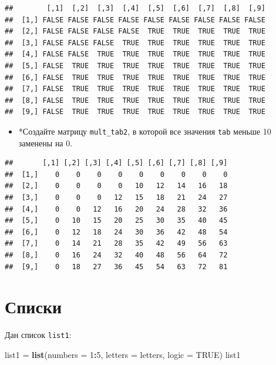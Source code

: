 \documentclass[]{book}
\newenvironment{Shaded}{\begin{snugshade}}{\end{snugshade}}
\newcommand{\KeywordTok}[1]{\textcolor[rgb]{0.13,0.29,0.53}{\textbf{#1}}}
\newcommand{\DataTypeTok}[1]{\textcolor[rgb]{0.13,0.29,0.53}{#1}}
\newcommand{\DecValTok}[1]{\textcolor[rgb]{0.00,0.00,0.81}{#1}}
\newcommand{\StringTok}[1]{\textcolor[rgb]{0.31,0.60,0.02}{#1}}
\newcommand{\OtherTok}[1]{\textcolor[rgb]{0.56,0.35,0.01}{#1}}
\newcommand{\OperatorTok}[1]{\textcolor[rgb]{0.81,0.36,0.00}{\textbf{#1}}}
\newcommand{\NormalTok}[1]{#1}
\providecommand{\tightlist}{%
  \setlength{\itemsep}{0pt}\setlength{\parskip}{0pt}}
\begin{document}
\begin{verbatim}
##        [,1]  [,2]  [,3]  [,4]  [,5]  [,6]  [,7]  [,8]  [,9]
##  [1,] FALSE FALSE FALSE FALSE FALSE FALSE FALSE FALSE FALSE
##  [2,] FALSE FALSE FALSE FALSE  TRUE  TRUE  TRUE  TRUE  TRUE
##  [3,] FALSE FALSE FALSE  TRUE  TRUE  TRUE  TRUE  TRUE  TRUE
##  [4,] FALSE FALSE  TRUE  TRUE  TRUE  TRUE  TRUE  TRUE  TRUE
##  [5,] FALSE  TRUE  TRUE  TRUE  TRUE  TRUE  TRUE  TRUE  TRUE
##  [6,] FALSE  TRUE  TRUE  TRUE  TRUE  TRUE  TRUE  TRUE  TRUE
##  [7,] FALSE  TRUE  TRUE  TRUE  TRUE  TRUE  TRUE  TRUE  TRUE
##  [8,] FALSE  TRUE  TRUE  TRUE  TRUE  TRUE  TRUE  TRUE  TRUE
##  [9,] FALSE  TRUE  TRUE  TRUE  TRUE  TRUE  TRUE  TRUE  TRUE
\end{verbatim}

\begin{itemize}
\tightlist
\item
  *Создайте матрицу \texttt{mult\_tab2}, в которой все значения
  \texttt{tab} меньше 10 заменены на 0.
\end{itemize}

\begin{verbatim}
##       [,1] [,2] [,3] [,4] [,5] [,6] [,7] [,8] [,9]
##  [1,]    0    0    0    0    0    0    0    0    0
##  [2,]    0    0    0    0   10   12   14   16   18
##  [3,]    0    0    0   12   15   18   21   24   27
##  [4,]    0    0   12   16   20   24   28   32   36
##  [5,]    0   10   15   20   25   30   35   40   45
##  [6,]    0   12   18   24   30   36   42   48   54
##  [7,]    0   14   21   28   35   42   49   56   63
##  [8,]    0   16   24   32   40   48   56   64   72
##  [9,]    0   18   27   36   45   54   63   72   81
\end{verbatim}

\section{Списки}\label{task_list}

Дан список \texttt{list1}:

\begin{Shaded}
\begin{Highlighting}[]
\NormalTok{list1 =}\StringTok{ }\KeywordTok{list}\NormalTok{(}\DataTypeTok{numbers =} \DecValTok{1}\OperatorTok{:}\DecValTok{5}\NormalTok{, }\DataTypeTok{letters =}\NormalTok{ letters, }\DataTypeTok{logic =} \OtherTok{TRUE}\NormalTok{)}
\NormalTok{list1}
\end{Highlighting}
\end{Shaded}
\end{document}
